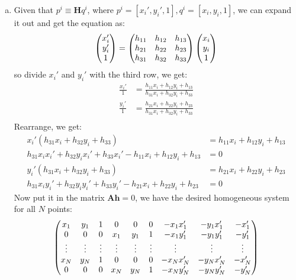 \documentclass[12pt,letterpaper,boxed]{hmcpset}
\begin{document}
\begin{solution}
\begin{enumerate}[(a)]
  \item Given that $p^i \equiv \mathbf{H}q^i$, where $p^i = [x_i', y_i', 1], q^i = [x_i, y_i,1]$, we can expand it out
  and  get the equation as:
  \begin{align*}
     \begin{pmatrix}
      x_i' \cr
      y_i' \cr
      1 \cr
      \end{pmatrix} &= \begin{pmatrix}
      h_{11} & h_{12} & h_{13}\cr
      h_{21} & h_{22} & h_{23}\cr
      h_{31} & h_{32} & h_{33}\cr
      \end{pmatrix} \begin{pmatrix}
      x_i \cr
      y_i \cr
      1 \cr
      \end{pmatrix}\\
  \end{align*}
  so divide $x_i'$ and $y_i'$ with the third row, we get:
  \begin{align*}
     \frac{x_i'}{1} &= \frac{h_{11}x_i + h_{12}y_i + h_{13}}{h_{31}x_i + h_{32}y_i + h_{33}}\\
     \frac{y_i'}{1} &= \frac{h_{21}x_i + h_{22}y_i + h_{23}}{h_{31}x_i + h_{32}y_i + h_{33}}\\
  \end{align*}
  Rearrange, we get:
  \begin{align*}
     x_i'(h_{31}x_i + h_{32}y_i + h_{33}) &= h_{11}x_i + h_{12}y_i + h_{13}\\
     h_{31}x_ix_i' + h_{32}y_i x_i'+ h_{33}x_i' -  h_{11}x_i + h_{12}y_i + h_{13} &= 0\\
     y_i'(h_{31}x_i + h_{32}y_i + h_{33}) &= h_{21}x_i + h_{22}y_i + h_{23}\\
     h_{31}x_iy_i' + h_{32}y_iy_i' + h_{33}y_i' - h_{21}x_i + h_{22}y_i + h_{23} &= 0
  \end{align*}
  Now put it in the matrix $\mathbf{Ah} = 0$, we have the desired homogeneous system for all $N$ points:
  \begin{align*}
     \begin{pmatrix}
      x_1& y_1& 1 & 0 & 0 &0&-x_1x_1'& -y_1x_1'&-x_1'\cr
      0 & 0 &0& x_1& y_1& 1 & -x_1y_1'& -y_1y_1'&-y_1'\cr
      \vdots&\vdots&\vdots&\vdots&\vdots&\vdots&\vdots&\vdots&\vdots\cr
      x_N& y_N& 1 & 0 & 0 &0&-x_Nx_N'& -y_Nx_N'&-x_N'\cr
      0 & 0 &0& x_N& y_N& 1 & -x_Ny_N'& -y_Ny_N'&-y_N'\cr
     \end{pmatrix} 

\end{align*}
\end{enumerate}
\end{solution}
\end{document}
